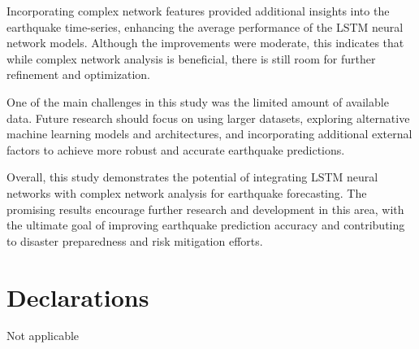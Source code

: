 \documentclass[sn-mathphys-num]{sn-jnl}
\begin{document}
Incorporating complex network features provided additional insights into the earthquake time-series, enhancing the average performance of the LSTM neural network models. Although the improvements were moderate, this indicates that while complex network analysis is beneficial, there is still room for further refinement and optimization.

One of the main challenges in this study was the limited amount of available data. Future research should focus on using larger datasets, exploring alternative machine learning models and architectures, and incorporating additional external factors to achieve more robust and accurate earthquake predictions.

Overall, this study demonstrates the potential of integrating LSTM neural networks with complex network analysis for earthquake forecasting. The promising results encourage further research and development in this area, with the ultimate goal of improving earthquake prediction accuracy and contributing to disaster preparedness and risk mitigation efforts.

\backmatter








\section*{Declarations}
Not applicable
\end{document}
